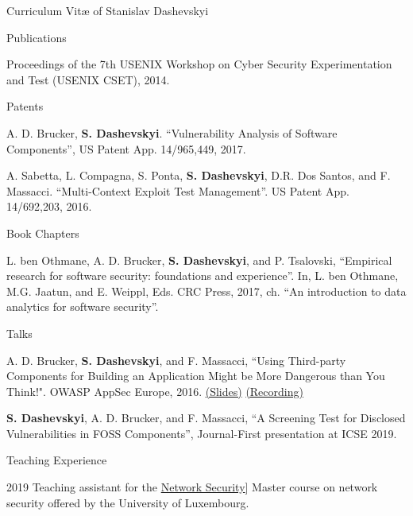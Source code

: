 \documentclass[11pt]{custom-style}
\begin{document}
\begin{cv}{Curriculum Vit\ae{} of Stanislav Dashevskyi}
\begin{cvlist}{Publications}
\begin{etaremune}
      Proceedings of the 7th USENIX Workshop on Cyber Security
      Experimentation and Test (USENIX CSET), 2014.
    \end{etaremune}
  \item[Patents]
    \begin{etaremune}
    \item A. D. Brucker, \textbf{S. Dashevskyi}. ``Vulnerability
      Analysis of Software Components'', US Patent App. 14/965,449,
      2017.
    \item A. Sabetta, L. Compagna, S. Ponta, \textbf{S. Dashevskyi},
      D.R. Dos Santos, and F. Massacci. ``Multi-Context Exploit Test
      Management''. US Patent App. 14/692,203, 2016.
    \end{etaremune}
  \item[Book Chapters]
    \begin{etaremune}
    \item L. ben Othmane, A. D. Brucker, \textbf{S. Dashevskyi}, and
      P. Tsalovski, ``Empirical research for software security:
      foundations and experience''. In, L. ben Othmane, M.G. Jaatun,
      and E. Weippl, Eds. CRC Press, 2017, ch. ``An introduction to
      data analytics for software security''.
    \end{etaremune}
    \item[Talks]
      \begin{etaremune}
      \item A. D. Brucker, \textbf{S. Dashevskyi}, and F. Massacci,
        ``Using Third-party Components for Building an Application
        Might be More Dangerous than You Think!". OWASP AppSec Europe,
        2016.
        \href{https://www.brucker.ch/bibliography/download/2016/talk-brucker.ea-owasp-third-party-security-2016-2x2.pdf}{(Slides)}
        \href{https://www.youtube.com/watch?v=zUDaP0m-gFU&feature=youtu.be}{(Recording)}
    \item \textbf{S. Dashevskyi}, A. D. Brucker, and F. Massacci,
        ``A Screening Test for Disclosed Vulnerabilities in FOSS Components'', Journal-First presentation at ICSE 2019.
      \end{etaremune}
  \end{cvlist}

  \begin{cvlist}{Teaching Experience}
      \item[2019] Teaching assistant for the \href{http://satoss.uni.lu/courses/networksecurity/}{Network Security}] 
                Master course on network security offered by the University of Luxembourg.


\end{cvlist}
\end{cv}
\end{document}
